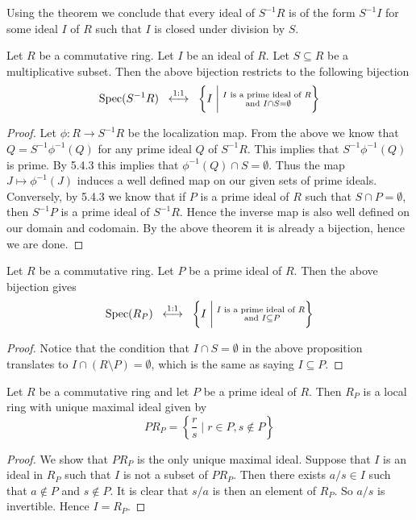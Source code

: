 \documentclass[a4paper]{article}
\begin{document}
Using the theorem we conclude that every ideal of $S^{-1}R$ is of the form $S^{-1}I$ for some ideal $I$ of $R$ such that $I$ is closed under division by $S$. 

\begin{prp}{}{} Let $R$ be a commutative ring. Let $I$ be an ideal of $R$. Let $S\subseteq R$ be a multiplicative subset. Then the above bijection restricts to the following bijection $$\text{Spec}(S^{-1}R)\;\;\overset{1:1}{\longleftrightarrow}\;\;\left\{I\;\bigg{|}\;\substack{I\text{ is a prime ideal of }R\\\text{ and }I\cap S=\emptyset}\right\}$$ 
\begin{proof}
Let $\phi:R\to S^{-1}R$ be the localization map. From the above we know that $Q=S^{-1}\phi^{-1}(Q)$ for any prime ideal $Q$ of $S^{-1}R$. This implies that $S^{-1}\phi^{-1}(Q)$ is prime. By 5.4.3 this implies that $\phi^{-1}(Q)\cap S=\emptyset$. Thus the map $J\mapsto\phi^{-1}(J)$ induces a well defined map on our given sets of prime ideals. \\

Conversely, by 5.4.3 we know that if $P$ is a prime ideal of $R$ such that $S\cap P=\emptyset$, then $S^{-1}P$ is a prime ideal of $S^{-1}R$. Hence the inverse map is also well defined on our domain and codomain. By the above theorem it is already a bijection, hence we are done. 
\end{proof}
\end{prp}

\begin{prp}{}{} Let $R$ be a commutative ring. Let $P$ be a prime ideal of $R$. Then the above bijection gives $$\text{Spec}(R_P)\;\;\overset{1:1}{\longleftrightarrow}\;\;\left\{I\;\bigg{|}\;\substack{I\text{ is a prime ideal of }R\\\text{ and }I\subseteq P}\right\}$$ 
\begin{proof}
Notice that the condition that $I\cap S=\emptyset$ in the above proposition translates to $I\cap (R\setminus P)=\emptyset$, which is the same as saying $I\subseteq P$. 
\end{proof}
\end{prp}

\begin{prp}{}{} Let $R$ be a commutative ring and let $P$ be a prime ideal of $R$. Then $R_P$ is a local ring with unique maximal ideal given by $$PR_P=\left\{\frac{r}{s}\;|\;r\in P,s\notin P\right\}$$ 
\begin{proof}
We show that $PR_P$ is the only unique maximal ideal. Suppose that $I$ is an ideal in $R_P$ such that $I$ is not a subset of $PR_P$. Then there exists $a/s\in I$ such that $a\notin P$ and $s\notin P$. It is clear that $s/a$ is then an element of $R_P$. So $a/s$ is invertible. Hence $I=R_P$. 
\end{proof}
\end{prp}
\end{document}
